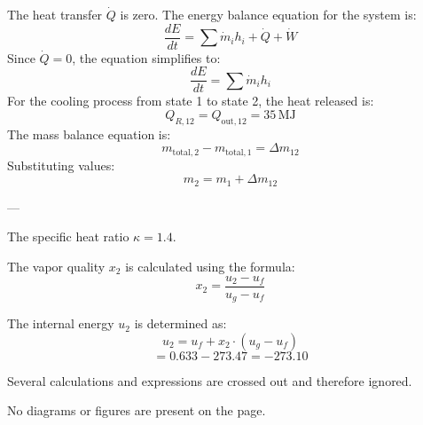 The heat transfer \( \dot{Q} \) is zero.  
The energy balance equation for the system is:  
\[
\frac{dE}{dt} = \sum \dot{m}_i h_i + \dot{Q} + \dot{W}
\]  
Since \( \dot{Q} = 0 \), the equation simplifies to:  
\[
\frac{dE}{dt} = \sum \dot{m}_i h_i
\]  
For the cooling process from state 1 to state 2, the heat released is:  
\[
Q_{R,12} = Q_{\text{out},12} = 35 \, \text{MJ}
\]  
The mass balance equation is:  
\[
m_{\text{total},2} - m_{\text{total},1} = \Delta m_{12}
\]  
Substituting values:  
\[
m_2 = m_1 + \Delta m_{12}
\]  

---

The specific heat ratio \( \kappa = 1.4 \).  

The vapor quality \( x_2 \) is calculated using the formula:  
\[
x_2 = \frac{u_2 - u_f}{u_g - u_f}
\]  

The internal energy \( u_2 \) is determined as:  
\[
u_2 = u_f + x_2 \cdot (u_g - u_f)
\]  
\[
= 0.633 - 273.47 = -273.10
\]  

Several calculations and expressions are crossed out and therefore ignored.  

No diagrams or figures are present on the page.
